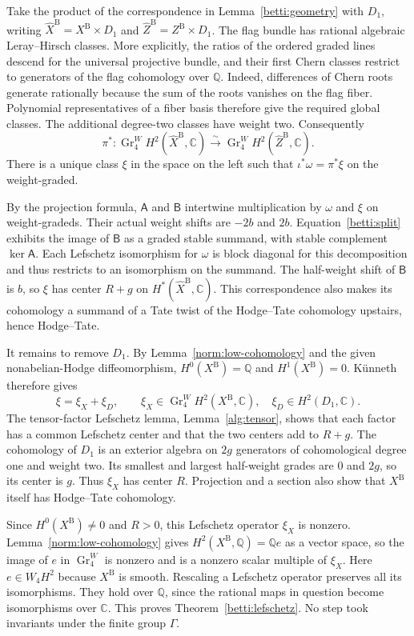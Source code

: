 Take the product of the correspondence in
Lemma~\ref{betti:geometry} with $D_1$, writing
$\widehat X^{\mathrm B}=X^{\mathrm B}\times D_1$ and
$\widehat Z^{\mathrm B}=Z^{\mathrm B}\times D_1$.
The flag bundle has rational algebraic Leray--Hirsch classes.  More
explicitly, the ratios of the ordered graded lines descend for the
universal projective bundle, and their first Chern classes restrict
to generators of the flag cohomology over $\mathbb Q$.  Indeed,
differences of Chern roots generate rationally because the sum of the
roots vanishes on the flag fiber.  Polynomial representatives of a
fiber basis therefore give the required global classes.
The additional degree-two classes have weight two.  Consequently
\[
 \pi^*:\operatorname{Gr}^W_4H^2(\widehat X^{\mathrm B},\mathbb C)
 \xrightarrow{\ \sim\ }
 \operatorname{Gr}^W_4H^2(\widehat Z^{\mathrm B},\mathbb C).
\]
There is a unique class $\xi$ in the space on the left such that
$\iota^*\omega=\pi^*\xi$ on the weight-graded.

By the projection formula, $\mathsf A$ and $\mathsf B$ intertwine
multiplication by $\omega$ and $\xi$ on weight-gradeds.  Their actual
weight shifts are $-2b$ and $2b$.  Equation~\eqref{betti:split} exhibits
the image of $\mathsf B$ as a graded stable summand, with stable
complement $\ker\mathsf A$.  Each Lefschetz isomorphism for $\omega$
is block diagonal for this decomposition and thus restricts to an
isomorphism on the summand.  The half-weight shift of $\mathsf B$ is
$b$, so $\xi$ has center $R+g$ on
$H^*(\widehat X^{\mathrm B},\mathbb C)$.  This correspondence also
makes its cohomology a summand of a Tate twist of the Hodge--Tate
cohomology upstairs, hence Hodge--Tate.

It remains to remove $D_1$.
By Lemma~\ref{norm:low-cohomology} and the given nonabelian-Hodge
diffeomorphism, $H^0(X^{\mathrm B})=\mathbb Q$ and
$H^1(X^{\mathrm B})=0$.  K\"unneth therefore gives
\[
 \xi=\xi_X+\xi_D,
 \qquad
 \xi_X\in\operatorname{Gr}^W_4H^2(X^{\mathrm B},\mathbb C),
 \quad
 \xi_D\in H^2(D_1,\mathbb C).
\]
The tensor-factor Lefschetz lemma, Lemma~\ref{alg:tensor}, shows that
each factor has a common Lefschetz center and that the two centers
add to $R+g$.  The cohomology of $D_1$ is an exterior algebra on $2g$
generators of cohomological degree one and weight two.  Its smallest
and largest half-weight grades are $0$ and $2g$, so its center is
$g$.  Thus $\xi_X$ has center $R$.  Projection and a section also
show that $X^{\mathrm B}$ itself has Hodge--Tate cohomology.

Since $H^0(X^{\mathrm B})\ne0$ and $R>0$, this Lefschetz operator
$\xi_X$ is nonzero.  Lemma~\ref{norm:low-cohomology} gives
$H^2(X^{\mathrm B},\mathbb Q)=\mathbb Q e$ as a vector space, so the
image of $e$ in $\operatorname{Gr}^W_4$ is nonzero and is a nonzero
scalar multiple of $\xi_X$.  Here $e\in W_4H^2$ because
$X^{\mathrm B}$ is smooth.  Rescaling a Lefschetz operator preserves
all its isomorphisms.  They hold over $\mathbb Q$, since the rational
maps in question become isomorphisms over $\mathbb C$.  This proves
Theorem~\ref{betti:lefschetz}.  No step took invariants under the
finite group $\Gamma$.
